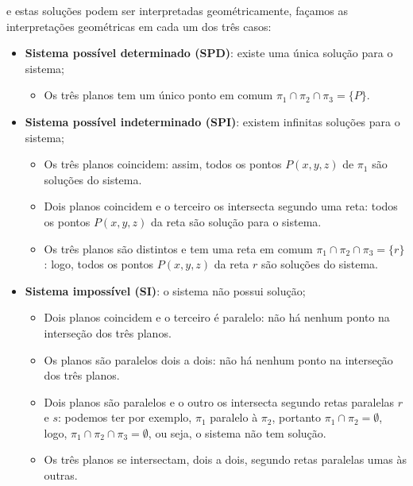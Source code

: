  e estas soluções podem ser interpretadas geométricamente, façamos as interpretações geométricas em cada um dos três casos:
 \begin{itemize}
  \item \textbf{Sistema possível determinado (SPD)}: existe uma única solução para o sistema;
  \begin{itemize}
    \item  Os três planos tem um único ponto em comum $\pi_1 \cap \pi_2 \cap \pi_3= \{P\}$.
  \end{itemize}

  \item \textbf{Sistema possível indeterminado (SPI)}: existem infinitas soluções para o sistema;
  \begin{itemize}
    \item Os três planos coincidem: assim, todos os pontos $P(x, y, z)$ de $\pi_1$ são soluções do sistema.

    \item Dois planos coincidem e o terceiro os intersecta segundo uma reta: todos os pontos $P(x, y, z)$ da reta são solução para o sistema.

    \item Os três planos são distintos e tem uma reta em comum $\pi_1 \cap \pi_2 \cap \pi_3= \{r\}$: logo, todos os pontos $P(x, y, z)$ da reta $r$ são soluções do sistema.
  \end{itemize}

  \item \textbf{Sistema impossível (SI)}: o sistema não possui solução;
  \begin{itemize}
  \item Dois planos coincidem e o terceiro é paralelo: não há nenhum ponto na interseção dos três planos.

  \item Os planos são paralelos dois a dois: não há nenhum ponto na interseção dos três planos.

  \item Dois planos são paralelos e o outro os intersecta segundo retas paralelas $r$ e $s$: podemos ter por exemplo, $\pi_1$ paralelo à $\pi_2$, portanto $\pi_1 \cap \pi_2 = \emptyset$,  logo, $\pi_1 \cap \pi_2 \cap \pi_3 = \emptyset$, ou seja, o sistema não tem solução.

  \item Os três planos se intersectam, dois a dois, segundo retas paralelas umas às outras.
  \end{itemize}

 \end{itemize}

\newpage

